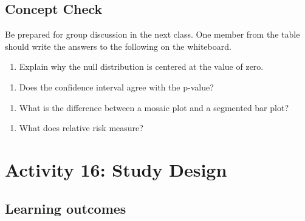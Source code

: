 \documentclass[
]{report}
\providecommand{\tightlist}{%
  \setlength{\itemsep}{0pt}\setlength{\parskip}{0pt}}
\begin{document}

\subsection{Concept Check}\label{concept-check-7}

Be prepared for group discussion in the next class. One member from the table should write the answers to the following on the whiteboard.

\begin{enumerate}
\def\labelenumi{\arabic{enumi}.}
\tightlist
\item
  Explain why the null distribution is centered at the value of zero.
\end{enumerate}

\vspace{0.5in}

\begin{enumerate}
\def\labelenumi{\arabic{enumi}.}
\setcounter{enumi}{1}
\tightlist
\item
  Does the confidence interval agree with the p-value?
\end{enumerate}

\vspace{0.5in}

\begin{enumerate}
\def\labelenumi{\arabic{enumi}.}
\setcounter{enumi}{2}
\tightlist
\item
  What is the difference between a mosaic plot and a segmented bar plot?
\end{enumerate}

\vspace{0.5in}

\begin{enumerate}
\def\labelenumi{\arabic{enumi}.}
\setcounter{enumi}{3}
\tightlist
\item
  What does relative risk measure?
  \newpage
\end{enumerate}

\section{Activity 16: Study Design}\label{activity-16-study-design}


\subsection{Learning outcomes}\label{learning-outcomes-17}
\end{document}
